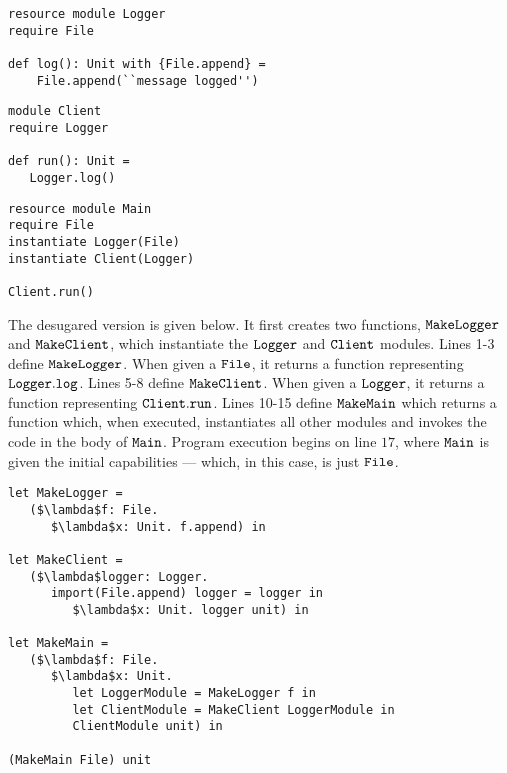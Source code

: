 \begin{lstlisting}
resource module Logger
require File

def log(): Unit with {File.append} =
    File.append(``message logged'')
\end{lstlisting}

\begin{lstlisting}
module Client
require Logger

def run(): Unit =
   Logger.log()
\end{lstlisting}

\begin{lstlisting}
resource module Main
require File
instantiate Logger(File)
instantiate Client(Logger)

Client.run()
\end{lstlisting}

The desugared version is given below. It first creates two functions, $\mathtt{MakeLogger}$ and $\mathtt{MakeClient}$, which instantiate the $\mathtt{Logger}$ and $\mathtt{Client}$ modules. Lines 1-3 define $\mathtt{MakeLogger}$. When given a $\mathtt{File}$, it returns a function representing $\mathtt{Logger.log}$. Lines 5-8 define $\mathtt{MakeClient}$. When given a $\mathtt{Logger}$, it returns a function representing $\mathtt{Client.run}$. Lines 10-15 define $\mathtt{MakeMain}$ which returns a function which, when executed, instantiates all other modules and invokes the code in the body of $\mathtt{Main}$. Program execution begins on line $17$, where $\mathtt{Main}$ is given the initial capabilities --- which, in this case, is just $\mathtt{File}$.

\begin{lstlisting}
let MakeLogger =
   ($\lambda$f: File.
      $\lambda$x: Unit. f.append) in
          
let MakeClient =
   ($\lambda$logger: Logger.
      import(File.append) logger = logger in
         $\lambda$x: Unit. logger unit) in
          
let MakeMain =
   ($\lambda$f: File.
      $\lambda$x: Unit.
         let LoggerModule = MakeLogger f in
         let ClientModule = MakeClient LoggerModule in
         ClientModule unit) in

(MakeMain File) unit
\end{lstlisting}

